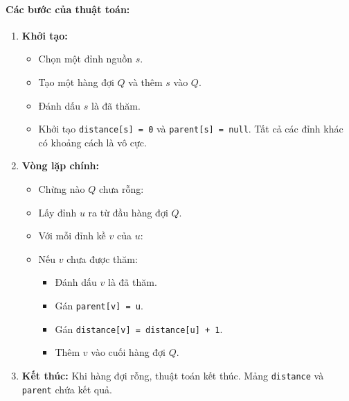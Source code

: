 \documentclass[a4paper,12pt]{article}
\begin{document}
\paragraph{Các bước của thuật toán:}
\begin{enumerate}
    \item \textbf{Khởi tạo:}
        \begin{itemize}
            \item Chọn một đỉnh nguồn $s$.
            \item Tạo một hàng đợi $Q$ và thêm $s$ vào $Q$.
            \item Đánh dấu $s$ là đã thăm.
            \item Khởi tạo \texttt{distance[s] = 0} và \texttt{parent[s] = null}. Tất cả các đỉnh khác có khoảng cách là vô cực.
        \end{itemize}
    \item \textbf{Vòng lặp chính:}
        \begin{itemize}
            \item Chừng nào $Q$ chưa rỗng:
            \item Lấy đỉnh $u$ ra từ đầu hàng đợi $Q$.
            \item Với mỗi đỉnh kề $v$ của $u$:
            \item Nếu $v$ chưa được thăm:
                \begin{itemize}
                    \item Đánh dấu $v$ là đã thăm.
                    \item Gán \texttt{parent[v] = u}.
                    \item Gán \texttt{distance[v] = distance[u] + 1}.
                    \item Thêm $v$ vào cuối hàng đợi $Q$.
                \end{itemize}
        \end{itemize}
    \item \textbf{Kết thúc:} Khi hàng đợi rỗng, thuật toán kết thúc. Mảng \texttt{distance} và \texttt{parent} chứa kết quả.
\end{enumerate}
\end{document}

